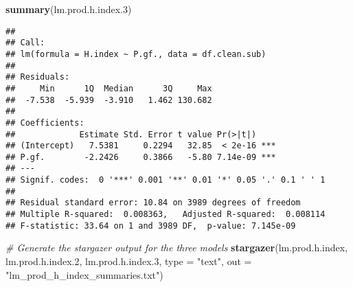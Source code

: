 \documentclass[
]{article}
\newenvironment{Shaded}{\begin{snugshade}}{\end{snugshade}}
\newcommand{\AttributeTok}[1]{\textcolor[rgb]{0.13,0.29,0.53}{#1}}
\newcommand{\CommentTok}[1]{\textcolor[rgb]{0.56,0.35,0.01}{\textit{#1}}}
\newcommand{\FloatTok}[1]{\textcolor[rgb]{0.00,0.00,0.81}{#1}}
\newcommand{\FunctionTok}[1]{\textcolor[rgb]{0.13,0.29,0.53}{\textbf{#1}}}
\newcommand{\NormalTok}[1]{#1}
\newcommand{\StringTok}[1]{\textcolor[rgb]{0.31,0.60,0.02}{#1}}
\begin{document}
\begin{Shaded}
\begin{Highlighting}[]
\FunctionTok{summary}\NormalTok{(lm.prod.h.index}\FloatTok{.3}\NormalTok{)}
\end{Highlighting}
\end{Shaded}

\begin{verbatim}
## 
## Call:
## lm(formula = H.index ~ P.gf., data = df.clean.sub)
## 
## Residuals:
##     Min      1Q  Median      3Q     Max 
##  -7.538  -5.939  -3.910   1.462 130.682 
## 
## Coefficients:
##             Estimate Std. Error t value Pr(>|t|)    
## (Intercept)   7.5381     0.2294   32.85  < 2e-16 ***
## P.gf.        -2.2426     0.3866   -5.80 7.14e-09 ***
## ---
## Signif. codes:  0 '***' 0.001 '**' 0.01 '*' 0.05 '.' 0.1 ' ' 1
## 
## Residual standard error: 10.84 on 3989 degrees of freedom
## Multiple R-squared:  0.008363,   Adjusted R-squared:  0.008114 
## F-statistic: 33.64 on 1 and 3989 DF,  p-value: 7.145e-09
\end{verbatim}

\begin{Shaded}
\begin{Highlighting}[]
\CommentTok{\# Generate the stargazer output for the three models}
\FunctionTok{stargazer}\NormalTok{(lm.prod.h.index, lm.prod.h.index}\FloatTok{.2}\NormalTok{, lm.prod.h.index}\FloatTok{.3}\NormalTok{,}
          \AttributeTok{type =} \StringTok{"text"}\NormalTok{, }\AttributeTok{out =} \StringTok{"lm\_prod\_h\_index\_summaries.txt"}\NormalTok{)}
\end{Highlighting}
\end{Shaded}
\end{document}
